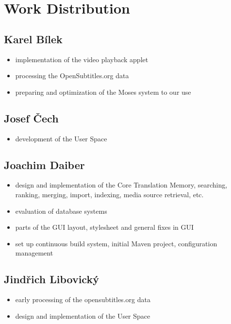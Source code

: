 {\section{Work Distribution}

\subsection*{Karel Bílek}

\begin{itemize}
	\item implementation of the video playback applet
	\item processing the OpenSubtitles.org data
	\item preparing and optimization of the Moses system to our use
\end{itemize}

\subsection*{Josef Čech}

\begin{itemize}
	\item development of the User Space
\end{itemize}

\subsection*{Joachim Daiber}

\begin{itemize}
	\item design and implementation of the Core Translation Memory, searching, ranking, merging, import, indexing, media source retrieval, etc.
	\item evaluation of database systems
	\item parts of the GUI layout, stylesheet and general fixes in GUI
	\item set up continuous build system, initial Maven project, configuration management
\end{itemize}



\subsection*{Jindřich Libovický}

\begin{itemize}
	\item early processing of the opensubtitles.org data
	\item design and implementation of the User Space
\end{itemize}


}

